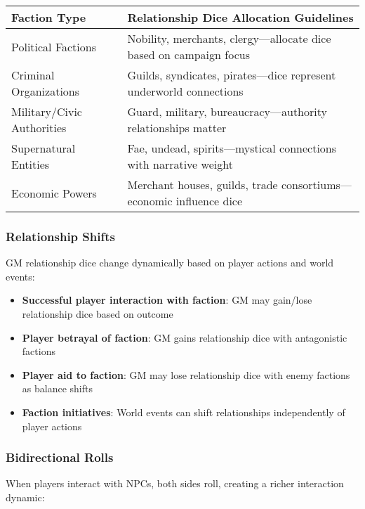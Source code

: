 \begin{fatebox}
\begin{tabularx}{\textwidth}{lX}
\toprule
\textbf{Faction Type} & \textbf{Relationship Dice Allocation Guidelines} \\
\midrule
Political Factions & Nobility, merchants, clergy—allocate dice based on campaign focus \\
Criminal Organizations & Guilds, syndicates, pirates—dice represent underworld connections \\
Military/Civic Authorities & Guard, military, bureaucracy—authority relationships matter \\
Supernatural Entities & Fae, undead, spirits—mystical connections with narrative weight \\
Economic Powers & Merchant houses, guilds, trade consortiums—economic influence dice \\
\bottomrule
\end{tabularx}
\end{fatebox}

\subsubsection*{Relationship Shifts}

GM relationship dice change dynamically based on player actions and world events:

\begin{itemize}
    \item \textbf{Successful player interaction with faction}: GM may gain/lose relationship dice based on outcome
    \item \textbf{Player betrayal of faction}: GM gains relationship dice with antagonistic factions
    \item \textbf{Player aid to faction}: GM may lose relationship dice with enemy factions as balance shifts
    \item \textbf{Faction initiatives}: World events can shift relationships independently of player actions
\end{itemize}

\subsubsection*{Bidirectional Rolls}

When players interact with NPCs, both sides roll, creating a richer interaction dynamic:

